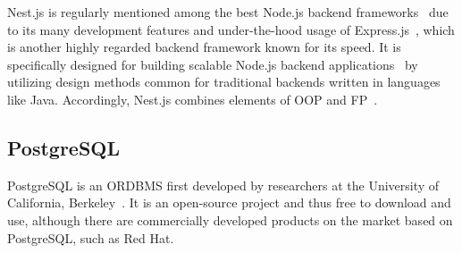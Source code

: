 Nest.js is regularly mentioned among the best Node.js backend frameworks~\autocites{clever_solution_9_2020}{labay_10_2020}{patel_top_2022} due to its many development features and under-the-hood usage of Express.js~\autocite{mysliwiec_documentation_nodate}, which is another highly regarded backend framework known for its speed.
It is specifically designed for building scalable Node.js backend applications~\autocite{mysliwiec_documentation_nodate} by utilizing design methods common for traditional backends written in languages like Java.
Accordingly, Nest.js combines elements of \gls{OOP} and \gls{FP}~\autocite{mysliwiec_documentation_nodate}.

\subsection{PostgreSQL}\label{subsec:postgresql}

PostgreSQL is an \gls{ORDBMS} first developed by researchers at the University of California, Berkeley~\autocite[3]{worsley_practical_2002}.
It is an open-source project and thus free to download and use, although there are commercially developed products on the market based on PostgreSQL, such as Red Hat.

